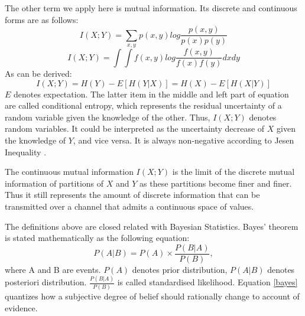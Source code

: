The other term we apply here is mutual information. Its 
discrete and continuous forms are as follows:
\begin{equation}
I(X;Y)=\sum_{x,y}p(x,y)log\frac{p(x,y)}{p(x)p(y)}
\end{equation}
\begin{equation}
I(X;Y)=\int \int f(x,y)log\frac{f(x,y)}{f(x)f(y)}dxdy
\end{equation}
As can be derived:
\begin{equation}\label{eq8}
I(X;Y)=H(Y)-E[H(Y|X)]=H(X)-E[H(X|Y)]
\end{equation}
$E$ denotes expectation. The latter item in the middle and 
left part of equation %
are called conditional entropy, which represents the 
residual uncertainty of a random variable given the 
knowledge of the other. Thus,
$I(X;Y)$ denotes %
random variables. It could be interpreted as 
the uncertainty decrease of $X$ given the knowledge of $Y$, 
and vice versa. It is always non-negative according to  
Jesen Inequality \citep{cover2012elements}.

The continuous mutual information $I(X;Y)$ is the limit of 
the discrete mutual information of partitions of $X$ and 
$Y$ as these partitions become finer and finer. Thus it  
still represents the amount of discrete information that 
can be transmitted over a channel that admits a continuous 
space of values.

The definitions above are closed related with Bayesian 
Statistics. Bayes' theorem is stated mathematically as the 
following equation:
\begin{equation}
\label{bayes}
P(A|B) = P(A)\times \frac{P(B | A)}{P(B)},
\end{equation}
where A and B are events.
$P(A)$ denotes prior distribution, $P(A|B)$ denotes 
posteriori distribution. $\frac{P(B | A)}{P(B)}$ is called 
standardised likelihood. 
Equation \ref{bayes} quantizes how a subjective degree of 
belief should rationally change to account of evidence. 


